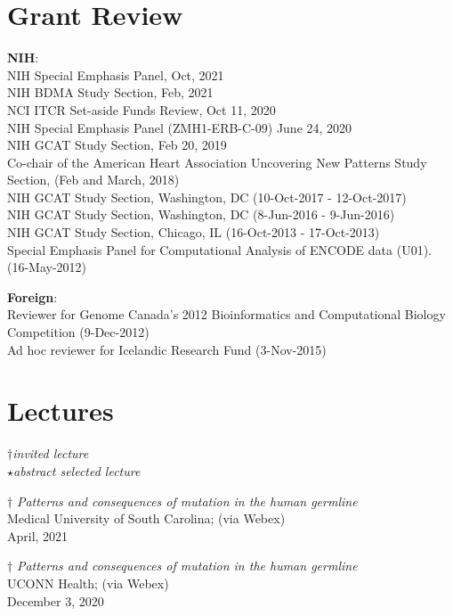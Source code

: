 \documentclass[margin,line]{cv}
\begin{document}
\begin{resume}
    \section{\mysidestyle Grant Review}
    \textbf{NIH}:\\
    NIH Special Emphasis Panel, Oct, 2021\\
    NIH BDMA Study Section, Feb, 2021\\
    NCI ITCR Set-aside Funds Review, Oct 11, 2020\\
    NIH Special Emphasis Panel (ZMH1-ERB-C-09) June 24, 2020\\
    NIH GCAT Study Section, Feb 20, 2019\\
    Co-chair of the American Heart Association Uncovering New Patterns Study Section, (Feb and March, 2018)\\
    NIH GCAT Study Section, Washington, DC (10-Oct-2017 - 12-Oct-2017)\\
    NIH GCAT Study Section, Washington, DC (8-Jun-2016 - 9-Jun-2016)\\
    NIH GCAT Study Section, Chicago, IL (16-Oct-2013 - 17-Oct-2013)\\
    Special Emphasis Panel for Computational Analysis of ENCODE data (U01). (16-May-2012)

    \textbf{Foreign}:\\
    Reviewer for Genome Canada's 2012 Bioinformatics and Computational Biology Competition (9-Dec-2012)\\
    Ad hoc reviewer for Icelandic Research Fund (3-Nov-2015)



    \section{\mysidestyle Lectures}

    $\dagger$\textit{invited lecture}\\
    $\star$\textit{abstract selected lecture}

    $\dagger$ \textit{Patterns and consequences of mutation in the human germline} \\
    Medical University of South Carolina; (via Webex) \\
    April, 2021

    $\dagger$ \textit{Patterns and consequences of mutation in the human germline} \\
    UCONN Health; (via Webex) \\
    December 3, 2020


\end{resume}
\end{document}
